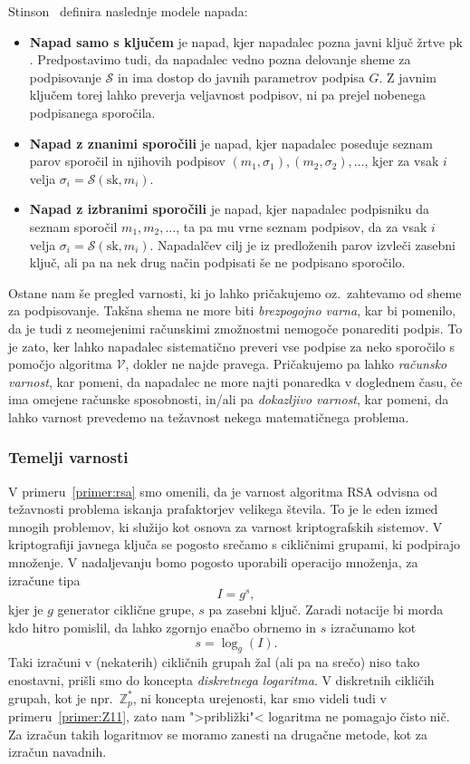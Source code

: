 \documentclass[isrm2, tisk]{fmfdelo}
\newcommand{\Z}{\mathbb Z}
\begin{document}
Stinson~\cite{stinson2023crypto} definira naslednje modele napada:
\begin{itemize}
    \item \textbf{Napad samo s ključem} je napad, kjer napadalec pozna javni ključ žrtve $\text{pk}$. 
        Predpostavimo tudi, da napadalec vedno pozna delovanje sheme za podpisovanje $\mathcal{S}$
        in ima dostop do javnih parametrov podpisa $G$. Z javnim ključem torej lahko preverja
        veljavnost podpisov, ni pa prejel nobenega podpisanega sporočila.
    \item \textbf{Napad z znanimi sporočili} je napad, kjer napadalec poseduje seznam parov sporočil 
        in njihovih podpisov $(m_1, \sigma_1), (m_2, \sigma_2), \dots$, kjer za vsak $i$ velja 
        $\sigma_i = \mathcal{S}(\text{sk}, m_i)$.
    \item \textbf{Napad z izbranimi sporočili} je napad, kjer napadalec podpisniku da seznam sporočil $m_1,
        m_2, \dots$, ta pa mu vrne seznam podpisov, da za vsak $i$ velja $\sigma_i = \mathcal{S}(\text{sk}, 
        m_i)$. Napadalčev cilj je iz predloženih parov izvleči zasebni ključ, ali pa na nek drug način
        podpisati še ne podpisano sporočilo.
\end{itemize}

Ostane nam še pregled varnosti, ki jo lahko pričakujemo oz.\ zahtevamo od sheme za podpisovanje. 
Takšna shema ne more biti \textit{brezpogojno varna}, kar bi pomenilo, da je tudi z neomejenimi 
računskimi zmožnostmi nemogoče ponarediti podpis. To je zato, ker lahko napadalec sistematično 
preveri vse podpise za neko sporočilo s pomočjo algoritma $\mathcal{V}$, dokler ne najde pravega. 
Pričakujemo pa lahko \textit{računsko varnost}, kar pomeni, da napadalec ne more najti ponaredka 
v doglednem času, če ima omejene računske sposobnosti, in/ali pa \textit{dokazljivo varnost}, kar 
pomeni, da lahko varnost prevedemo na težavnost nekega matematičnega problema.

\subsubsection{Temelji varnosti}
V primeru~\ref{primer:rsa} smo omenili, da je varnost algoritma RSA odvisna od težavnosti problema
iskanja prafaktorjev velikega števila. To je le eden izmed mnogih problemov, ki služijo kot osnova
za varnost kriptografskih sistemov. V kriptografiji javnega ključa se pogosto srečamo s cikličnimi
grupami, ki podpirajo množenje. V nadaljevanju bomo pogosto uporabili operacijo množenja, za izračune
tipa 
$$
I = g^s,
$$
kjer je $g$ generator ciklične grupe, $s$ pa zasebni ključ. Zaradi notacije bi morda kdo hitro pomislil,
da lahko zgornjo enačbo obrnemo in $s$ izračunamo kot 
$$ 
s = \log_g(I).
$$
Taki izračuni v (nekaterih) cikličnih grupah žal (ali pa na srečo) niso tako enostavni, prišli smo do
koncepta \textit{diskretnega logaritma}. V diskretnih cikličih grupah, kot je npr.\ $\Z_p^*$, ni koncepta
urejenosti, kar smo videli tudi v primeru~\ref{primer:Z11}, zato nam ">približki"< logaritma ne pomagajo
čisto nič. Za izračun takih logaritmov se moramo zanesti na drugačne metode, kot za izračun navadnih.
\end{document}
